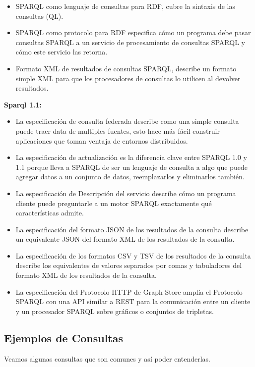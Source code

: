 \documentclass[conference]{IEEEtran}
\begin{document}
\begin{itemize}
	\item SPARQL como lenguaje de consultas para RDF, cubre la sintaxis de las consultas (QL).
	\item SPARQL como protocolo para RDF especifica cómo un programa debe pasar consultas SPARQL a un servicio de procesamiento de consultas SPARQL y cómo este servicio las retorna. 
	\item Formato XML de resultados de consultas SPARQL, describe un formato simple XML para que los procesadores de consultas lo utilicen al devolver resultados.
	
\end{itemize}
\newpage
\textbf{Sparql 1.1:}
\begin{itemize}
	\item La especificación de consulta federada describe como una simple consulta puede traer data de multiples fuentes, esto hace más fácil construir aplicaciones que toman ventaja de entornos distribuidos.
	\item La especificación de actualización es la diferencia clave entre SPARQL 1.0 y 1.1 porque lleva a SPARQL de ser un lenguaje de consulta a algo que puede agregar datos a un conjunto de datos, reemplazarlos y eliminarlos también.
	\item La especificación de Descripción del servicio describe cómo un programa cliente puede preguntarle a un motor SPARQL exactamente qué características admite.
	\item La especificación del formato JSON de los resultados de la consulta describe un equivalente JSON del formato XML de los resultados de la consulta.
	\item La especificación de los formatos CSV y TSV de los resultados de la consulta describe los equivalentes de valores separados por comas y tabuladores del formato XML de los resultados de la consulta.
	\item La especificación del Protocolo HTTP de Graph Store amplía el Protocolo SPARQL con una API similar a REST para la comunicación entre un cliente y un procesador SPARQL sobre gráficos o conjuntos de tripletas.  \cite{b4}
	
\end{itemize}

\subsection{Ejemplos de Consultas}
Veamos algunas consultas que son comunes y así poder entenderlas.
\end{document}
